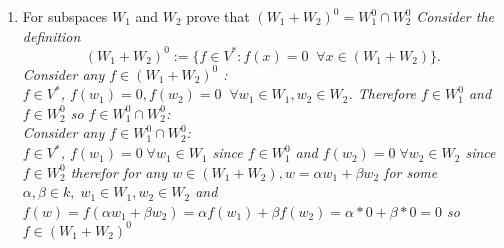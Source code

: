 \documentclass{article}
\begin{document}
{\begin{enumerate}
{                    $f(w) = 0$ by definition of $w \in W_1^{0}$. This proves the first direction. The other direction is trivial since in the definition
                    of the two sets we can interchange $W_1$ and $W_2$.
                }
            \item For subspaces $W_1$ and $W_2$ prove that $(W_1+W_2)^{0} = W_1^{0} \cap W_2^{0}$
                \emph{
                    Consider the definition
                    \[
                        (W_1+W_2)^{0} := \{f \in V^{*}: f(x) = 0 \;\; \forall x \in (W_1+W_2)\}
                    .\] 
                    Consider any $f \in (W_1+W_2)^{0}$ :\\
                    $f \in V^{*}$, $f(w_1) = 0, f(w_2) = 0 \;\; \forall w_1 \in W_1, w_2 \in W_2$. Therefore $f \in W_1^{0}$ and $f \in W_2^{0}$ so $f \in W_1^{0}\cap W_2^{0}$:\\
                    Consider any $f \in W_1^{0} \cap W_2^{0}$:\\
                    $f \in V^{*}$, $f(w_1) = 0 \; \forall w_1 \in W_1$ since $f \in W_1^{0}$ and $f(w_2) = 0 \; \forall w_2 \in W_2$ since $f \in W_2^{0}$ 
                    therefor for any $w \in (W_1+W_2), w = \alpha w_1 + \beta w_2$ for some $\alpha,\beta \in k, \; w_1 \in W_1, w_2 \in W_2$ and 
                    $f(w) = f(\alpha w_1 + \beta w_2) = \alpha f(w_1) + \beta f(w_2) = \alpha * 0 + \beta * 0 = 0$ so $f \in (W_1+W_2)^{0}$
                }
        \end{enumerate}
    }
\end{document}
